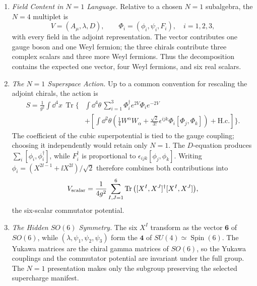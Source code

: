 \begin{enumerate}
  \begin{enumerate}
    \item \emph{Field Content in \(N=1\) Language.}
    Relative to a chosen \(N=1\) subalgebra, the \(N=4\) multiplet is
      \[
        V=(A_\mu,\lambda,D),\qquad
        \Phi_i=(\phi_i,\psi_i,F_i),\quad i=1,2,3,
      \]
      with every field in the adjoint representation.  The vector contributes
      one gauge boson and one Weyl fermion; the three chirals contribute three
      complex scalars and three more Weyl fermions.  Thus the decomposition
      contains the expected one vector, four Weyl fermions, and six real
      scalars.
    \item \emph{The \(N=1\) Superspace Action.}
    Up to a common convention for rescaling the adjoint chirals, the action is
      \[
      \begin{aligned}
        S=\frac1{g^2}\int \dd^4x\,\operatorname{Tr}\Bigg\{&
          \int \dd^4\theta\,
             \sum_{i=1}^3
             \Phi_i^\dagger e^{2V}\Phi_i e^{-2V}\\
          &+\left[
          \int \dd^2\theta\left(
             \frac14 W^\alpha W_\alpha
             +\frac{\sqrt2}{3!}\epsilon^{ijk}
                \Phi_i[\Phi_j,\Phi_k]\right)
          +\mathrm{H.c.}\right]\Bigg\}.
      \end{aligned}
      \]
      The coefficient of the cubic superpotential is tied to the gauge
      coupling; choosing it independently would retain only \(N=1\).
      The \(D\)-equation produces
      \(\sum_i[\phi_i,\phi_i^\dagger]\), while
      \(F_i^\dagger\) is proportional to
      \(\epsilon_{ijk}[\phi_j,\phi_k]\).  Writing
      \(\phi_i=(X^{2\ii-1}+\ii X^{2\ii})/\sqrt2\) therefore combines both
      contributions into
      \[
        V_{\rm scalar}
          =\frac1{4g^2}\sum_{I,J=1}^6
             \operatorname{Tr}
             \big([X^I,X^J]^\dagger[X^I,X^J]\big),
      \]
      the six-scalar commutator potential.
    \item \emph{The Hidden \(SO(6)\) Symmetry.}
    The six \(X^I\) transform as the vector \(\mathbf6\) of
      \(SO(6)\), while
      \((\lambda,\psi_1,\psi_2,\psi_3)\) form the
      \(\mathbf4\) of
      \(SU(4)\simeq\operatorname{Spin}(6)\).  The Yukawa matrices are the
      chiral gamma matrices of \(SO(6)\), so the Yukawa couplings and the
      commutator potential are invariant under the full group.  The
      \(N=1\) presentation makes only the subgroup preserving the selected
      supercharge manifest.


\end{enumerate}
\end{enumerate}
